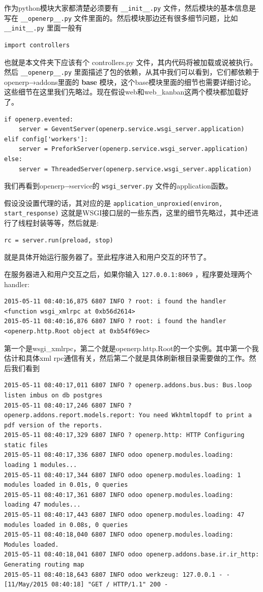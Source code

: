 \documentclass[11pt,a4paper]{sphinxmanual}
\begin{document}
作为python模块大家都清楚必须要有 \verb~__init__.py~ 文件，然后模块的基本信息是写在 \verb~__openerp__.py~ 文件里面的。然后模块那边还有很多细节问题，比如 \verb~__init__.py~ 里面一般有
\begin{Verbatim}
import controllers
\end{Verbatim}
也就是本文件夹下应该有个 controllers.py 文件，其内代码将被加载或说被执行。 然后 \verb~__openerp__.py~ 里面描述了包的依赖，从其中我们可以看到，它们都依赖于openerp→addons里面的 \textbf{base} 模块，这个base模块里面的细节也需要详细讨论。这些细节在这里我们先略过。现在假设web和web\_kanban这两个模块都加载好了。

\begin{Verbatim}
if openerp.evented:
    server = GeventServer(openerp.service.wsgi_server.application)
elif config['workers']:
    server = PreforkServer(openerp.service.wsgi_server.application)
else:
    server = ThreadedServer(openerp.service.wsgi_server.application)
\end{Verbatim}

我们再看到openerp→service的 \verb~wsgi_server.py~ 文件的application函数。

假设没设置代理的话，其对应的是 \verb~application_unproxied(environ, start_response)~ 这就是WSGI接口层的一些东西，这里的细节先略过，其中还进行了线程封装等等，然后就是:

\begin{Verbatim}
rc = server.run(preload, stop)
\end{Verbatim}

就是具体开始运行服务器了。至此程序进入和用户交互的环节了。


在服务器进入和用户交互之后，如果你输入 \verb~127.0.0.1:8069~ ，程序要处理两个handler:
\begin{Verbatim}
2015-05-11 08:40:16,875 6807 INFO ? root: i found the handler <function wsgi_xmlrpc at 0xb56d2614> 
2015-05-11 08:40:16,876 6807 INFO ? root: i found the handler <openerp.http.Root object at 0xb54f69ec>
\end{Verbatim}

第一个是wsgi\_xmlrpc，第二个就是openerp.http.Root的一个实例。其中第一个我估计和具体xml rpc通信有关，然后第二个就是具体刷新根目录需要做的工作。然后我们看到
\begin{Verbatim}
2015-05-11 08:40:17,011 6807 INFO ? openerp.addons.bus.bus: Bus.loop listen imbus on db postgres
2015-05-11 08:40:17,246 6807 INFO ? openerp.addons.report.models.report: You need Wkhtmltopdf to print a pdf version of the reports.
2015-05-11 08:40:17,329 6807 INFO ? openerp.http: HTTP Configuring static files
2015-05-11 08:40:17,336 6807 INFO odoo openerp.modules.loading: loading 1 modules...
2015-05-11 08:40:17,344 6807 INFO odoo openerp.modules.loading: 1 modules loaded in 0.01s, 0 queries
2015-05-11 08:40:17,361 6807 INFO odoo openerp.modules.loading: loading 47 modules...
2015-05-11 08:40:17,443 6807 INFO odoo openerp.modules.loading: 47 modules loaded in 0.08s, 0 queries
2015-05-11 08:40:18,040 6807 INFO odoo openerp.modules.loading: Modules loaded.
2015-05-11 08:40:18,041 6807 INFO odoo openerp.addons.base.ir.ir_http: Generating routing map
2015-05-11 08:40:18,643 6807 INFO odoo werkzeug: 127.0.0.1 - - [11/May/2015 08:40:18] "GET / HTTP/1.1" 200 -
\end{Verbatim}
\end{document}
